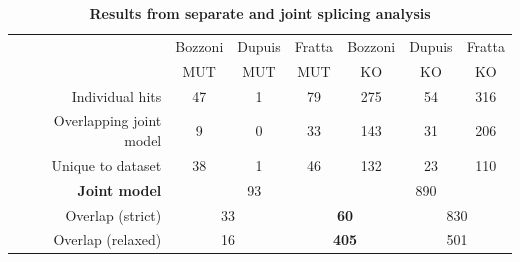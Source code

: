 \begingroup
\renewcommand{\arraystretch}{1.5} 
\begin{table}[h]
	\begin{tabular}{|r|ccc|ccc|}
		\hline
		& Bozzoni & Dupuis & Fratta & Bozzoni & Dupuis & Fratta\\[-0.3cm]
		& MUT & MUT & MUT & KO & KO & KO\\
		\hline
		Individual hits                & 47 & 1 & 79 & 275 & 54 & 316 \\
		Overlapping joint model & 9 & 0 & 33 & 143 & 31 & 206 \\
		Unique to dataset          & 38 & 1 & 46 & 132 & 23 & 110 \\
		\hline
		\textbf{Joint model}       & \multicolumn{3}{c|}{93} & \multicolumn{3}{c|}{890} \\
		\hline
		Overlap (strict)              & \multicolumn{2}{c|}{33} & \multicolumn{2}{c|}{\textbf{60}} & \multicolumn{2}{c|}{830} \\
		Overlap (relaxed)           & \multicolumn{2}{c|}{16} & \multicolumn{2}{c|}{\textbf{405} } & \multicolumn{2}{c|}{501} \\
		\hline
	\end{tabular}
	\caption[Results from separate and joint splicing analysis]{\textbf{Results from separate and joint splicing analysis}}
	\label{tab:splicing_results}
\end{table}
\endgroup

